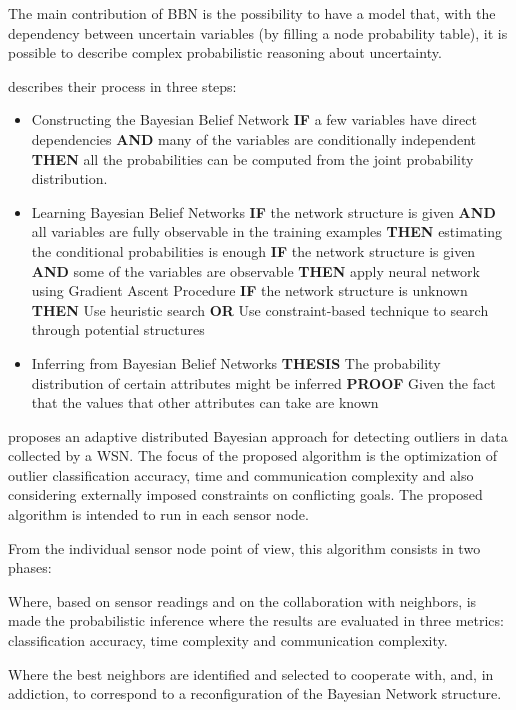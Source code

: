 The main contribution of BBN is the possibility to have a model that, with the dependency between uncertain variables (by filling a node probability table), it is possible to describe complex probabilistic reasoning about uncertainty.

\cite{class:janakiram:2006} describes their process in three steps:

\begin{itemize}
	
	\item Constructing the Bayesian Belief Network
	\subitem \textbf{IF} a few variables have direct dependencies
	\subitem \textbf{AND} many of the variables are conditionally independent
	\subitem \textbf{THEN} all the probabilities can be computed from the joint probability distribution.
	
	\item Learning Bayesian Belief Networks
	\subitem \textbf{IF} the network structure is given
	\subitem \textbf{AND} all variables are fully observable in the training examples
	\subitem \textbf{THEN} estimating the conditional probabilities is enough
	\subitem
	\subitem \textbf{IF} the network structure is given
	\subitem \textbf{AND} some of the variables are observable
	\subitem \textbf{THEN} apply neural network using Gradient Ascent Procedure
	\subitem
	\subitem \textbf{IF} the network structure is unknown
	\subitem \textbf{THEN} Use heuristic search
	\subitem \textbf{OR} Use constraint-based technique to search through potential structures
	
	
	\item Inferring from Bayesian Belief Networks
	\subitem \textbf{THESIS} The probability distribution of certain attributes might be inferred
	\subitem \textbf{PROOF} Given the fact that the values that other attributes can take are known	
\end{itemize}

\cite{class:paola:2015} proposes an adaptive distributed Bayesian approach for detecting outliers in data collected by a WSN.
The focus of the proposed algorithm is the optimization of outlier classification accuracy, time and communication complexity and also considering externally imposed constraints on conflicting goals. The proposed algorithm is intended to run in each sensor node. 

From the individual sensor node point of view, this algorithm consists in two phases:

\begin{description}
	\setlength\itemsep{-0.5em}
	\item[Outlier detection]  
	Where, based on sensor readings and on the collaboration with neighbors, is made the probabilistic inference where the results are evaluated in three metrics: classification accuracy, time complexity and communication complexity.
	
	\item[Neighborhood selection] 
	Where the best neighbors are identified and selected to cooperate with, and, in addiction, to correspond to a reconfiguration of the Bayesian Network structure.
\end{description}

